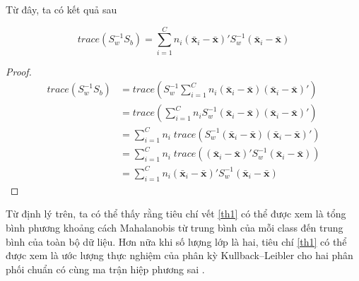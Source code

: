 Từ đây, ta có kết quả sau
\begin{theorem}
	\begin{equation}\label{th1}
		trace(S_w^{-1}S_b) = \sum_{i=1}^Cn_i(\bar{\boldsymbol{x}}_i- \bar{\boldsymbol{x}})'S_w^{-1}(\bar{\boldsymbol{x}}_i- \bar{\boldsymbol{x}})
	\end{equation}
\end{theorem}
\begin{proof}
	\begin{align*}\label{th1}
		trace(S_w^{-1}S_b) &= trace\left(S_w^{-1}\sum_{i=1}^Cn_i(\bar{\boldsymbol{x} }_i-\bar{\boldsymbol{x} })(\bar{\boldsymbol{x} }_i-\bar{\boldsymbol{x} })'\right)\\
		&= trace\left(\sum_{i=1}^Cn_iS_w^{-1}(\bar{\boldsymbol{x} }_i-\bar{\boldsymbol{x} })(\bar{\boldsymbol{x} }_i-\bar{\boldsymbol{x} })'\right)\\
		&= \sum_{i=1}^Cn_i\;trace\left(S_w^{-1}(\bar{\boldsymbol{x} }_i-\bar{\boldsymbol{x} })(\bar{\boldsymbol{x} }_i-\bar{\boldsymbol{x} })'\right)\\    
		&= \sum_{i=1}^Cn_i\;trace\left((\bar{\boldsymbol{x} }_i-\bar{\boldsymbol{x} })'S_w^{-1}(\bar{\boldsymbol{x} }_i-\bar{\boldsymbol{x} })\right)\\   
		&= \sum_{i=1}^Cn_i(\bar{\boldsymbol{x}}_i- \bar{\boldsymbol{x}})'S_w^{-1}(\bar{\boldsymbol{x}}_i- \bar{\boldsymbol{x}})
	\end{align*}
\end{proof}
Từ định lý trên, ta có thể thấy rằng tiêu chí vết \ref{th1} có thể được xem là tổng bình phương khoảng cách Mahalanobis từ trung bình của mỗi class đến trung bình của toàn bộ dữ liệu. Hơn nữa khi số lượng lớp là hai, tiêu chí \ref{th1} có thể được xem là ước lượng thực nghiệm của phân kỳ Kullback–Leibler cho hai phân phối chuẩn có cùng ma trận hiệp phương sai \cite{kong2014pairwise}. 

